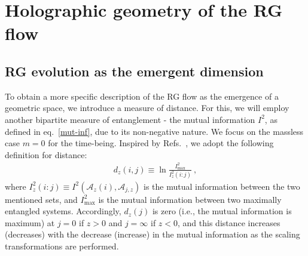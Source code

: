 \section{Holographic geometry of the RG flow}
\label{holography}
\subsection{RG evolution as the emergent dimension}
To obtain a more specific description of the RG flow as the emergence of a geometric space, we introduce a measure of distance. For this, we will employ another bipartite measure of entanglement - the mutual information \(I^2\), as defined in eq.~\eqref{mut-inf}, due to its non-negative nature. We focus on the massless case \(m=0\) for the time-being. Inspired by Refs.~\cite{van2010building,lee2016,hyatt2017,anirban_mott_2022}, we adopt the following definition for distance:
\begin{equation}\begin{aligned}
	\label{info-dist}
	d_z(i,j) \equiv \ln \frac{I^2_\text{max}}{I^2_z(i:j)}~,
\end{aligned}\end{equation}
where \(I^2_z(i:j) \equiv I^2\left( \mathcal{A}_{z}(i), \mathcal{A}_{j,z} \right) \) is the mutual information between the two mentioned sets, and \(I^2_\text{max}\) is the mutual information between two maximally entangled systems. Accordingly, \(d_z(j)\) is zero (i.e., the mutual information is maximum) at \(j=0\) if \(z>0\) and \(j=\infty\) if \(z<0\), and this distance increases (decreases) with the decrease (increase) in the mutual information as the scaling transformations are performed.

